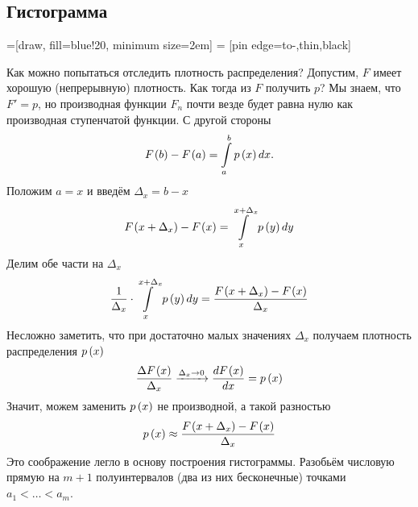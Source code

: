 \subsection{Гистограмма}
\label{subsection:histogram}
=[draw, fill=blue!20, minimum size=2em]
 = [pin edge={to-,thin,black}]

Как можно попытаться отследить плотность распределения?
Допустим, $F$ имеет хорошую (непрерывную) плотность.
Как тогда из $F$ получить $p$?
Мы знаем, что $F'=p$, но производная функции $F_n$ почти везде будет равна нулю
как производная ступенчатой функции.
С другой стороны
\begin{equation*}
  F_{}\left(b\right)-F_{}\left(a\right)=\int\limits_a^b p\left(x\right) dx.
\end{equation*}
Положим $a=x$ и введём $\Delta_x=b-x$
$$F_{}\left(x+\Delta_x\right)-F_{}\left(x\right)=\int\limits_x^{x+\Delta_x} p\left(y\right) dy$$
Делим обе части на $\Delta_x$
\begin{equation*}
  \frac{1}{\Delta_x}\cdot\int\limits_x^{x+\Delta_x} p\left(y\right) dy
   = \frac{F_{}\left(x+\Delta_x\right)-F_{}\left(x\right)}{\Delta_x}
\end{equation*}
Несложно заметить, что при достаточно малых значениях $\Delta_x$
получаем плотность распределения $p\left(x\right)$
\begin{equation*}
  \frac{\Delta F_{}\left(x\right)}{\Delta_x} \xrightarrow[]{\Delta_x\to 0}
    \frac{dF_{}\left(x\right)}{dx}
  =p\left(x\right)
\end{equation*}
Значит, можем заменить $p\left(x\right)$ не производной, а такой разностью
\begin{equation*}
  p\left(x\right)\approx\frac{F_{}\left(x+\Delta_x\right)-F_{}\left(x\right)}{\Delta_x}
\end{equation*}
Это соображение легло в основу построения гистограммы.
Разобьём числовую прямую на $m+1$ полуинтервалов (два из них бесконечные)
точками $a_1 < \dots < a_m$.
\begin{comment}
Возьмём $m$ полуинтервалов на числовой прямой
$I_j=\left(a_{j-1},a_j\right], i=\overline{1,m}$
таких, каждое значение выборки попадает в свой интервал.
Для этого определим пару свойств точек, ограничивающих эти интервалы:
\begin{enumerate}
  \item Каждая следующая точка строго правее (больше) предыдущей
    (так как зачем нам одинаковые точки?)
    $$a_0<a_1<\dots<a_m$$
  \item Каждое значение выборки должно попадать ровно в один полуинтервал.
    Очевидно, что данные полуинтервалы $I_j$ не пересекаются между собой.
    Значит, осталось потребовать, чтобы
    крайнее левое значение было меньше минимального значения из выборки,
    а крайнее правое --- не меньше максимального
    $$a_0<min\left(X\right)\le max\left(X\right)\le a_m$$
\end{enumerate}

Введём функцию $q\left(y\right)$
$$q\left(y\right)
=\sum_{j=1}^m \frac{\cdf{a_j}-\cdf{a_{j-1}}}{a_j-a_{j-1}}
  \cdot\indicator{y\in I_j}$$
\end{comment}
